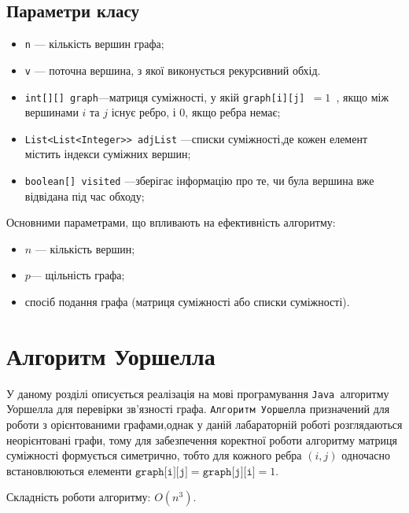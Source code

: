 \documentclass[12pt,a4paper]{article}
\begin{document}
\subsection{Параметри класу}
\begin{itemize}
    \item \texttt{n} --- кількість вершин графа;
    \item \texttt{v} --- поточна вершина, з якої виконується рекурсивний обхід.
    \item \texttt{int[][] graph}---матриця суміжності, 
    у якій \texttt{graph[i][j] $ =1$ }, якщо між вершинами $i$ та $j$ існує ребро, 
    і $0$, якщо ребра немає;
    \item \texttt{List<List<Integer>> adjList} ---списки суміжності,де кожен елемент містить індекси суміжних вершин;
    \item \texttt{boolean[] visited} ---зберігає інформацію про те, чи була вершина вже відвідана під час обходу;
\end{itemize}

Основними параметрами, що впливають на ефективність алгоритму:
\begin{itemize}
    \item $n$ --- кількість вершин;
    \item$p$--- щільність графа;
    \item спосіб подання графа (матриця суміжності або списки суміжності).
\end{itemize}

\section{Алгоритм Уоршелла}
У даному розділі описується реалізація на мові програмування \texttt{Java }алгоритму Уоршелла для перевірки зв’язності графа.
\texttt{Алгоритм Уоршелла} призначений для роботи з орієнтованими графами,однак у даній лабараторній роботі розглядаються неорієнтовані графи, 
тому для забезпечення коректної роботи алгоритму 
матриця суміжності формується симетрично, тобто 
для кожного ребра $(i,j)$ одночасно встановлюються елементи 
$\texttt{graph[i][j]} = \texttt{graph[j][i]} = 1$. 

Складність роботи алгоритму: $O(n^3)$.
\end{document}
